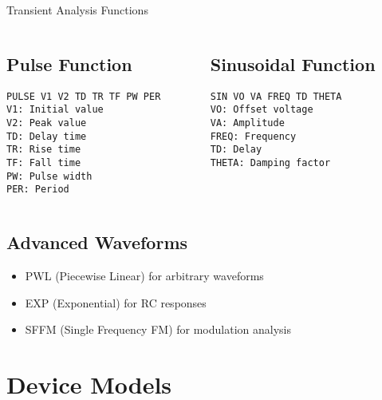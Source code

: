 \documentclass{beamer}
\begin{document}
\begin{frame}{Transient Analysis Functions}
    \begin{columns}
        \begin{column}{0.5\textwidth}
            \subsection{Pulse Function}
            \begin{lstlisting}
PULSE V1 V2 TD TR TF PW PER
V1: Initial value
V2: Peak value  
TD: Delay time
TR: Rise time
TF: Fall time
PW: Pulse width
PER: Period
            \end{lstlisting}
        \end{column}
        \begin{column}{0.5\textwidth}
            \subsection{Sinusoidal Function}
            \begin{lstlisting}
SIN VO VA FREQ TD THETA
VO: Offset voltage
VA: Amplitude
FREQ: Frequency
TD: Delay
THETA: Damping factor
            \end{lstlisting}
        \end{column}
    \end{columns}
    
    \subsection{Advanced Waveforms}
    \begin{itemize}
        \item PWL (Piecewise Linear) for arbitrary waveforms
        \item EXP (Exponential) for RC responses
        \item SFFM (Single Frequency FM) for modulation analysis
    \end{itemize}
\end{frame}

\section{Device Models}
\end{document}
